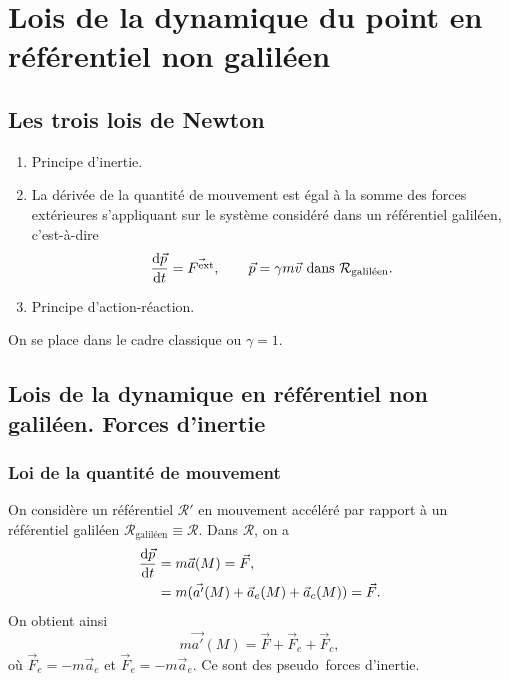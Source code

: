\section[Lois de la dynamique du point]{Lois de la dynamique du point en référentiel non galiléen}

    \subsection{Les trois lois de Newton}

        \begin{enumerate}[label=\arabic*.]
            \item Principe d'inertie.
            \item La dérivée de la quantité de mouvement est égal à la somme des forces extérieures s'appliquant sur le système considéré dans un référentiel galiléen, c'est-à-dire
            \begin{equation}
                \frac{\mathrm{d}\vec{p}}{\mathrm{d} t}=\vec{F^{\text{ext}}},\qquad \vec{p}=\gamma m\vec{v}\text{ dans }\mathcal{R}_{\text{galiléen}}.
            \end{equation}
            \item Principe d'action-réaction.
        \end{enumerate}
        On se place dans le cadre classique ou $\gamma=1$.
    
    \subsection{Lois de la dynamique en référentiel non galiléen. Forces d'inertie}
        \subsubsection{Loi de la quantité de mouvement}

            On considère un référentiel $\mathcal{R}'$ en mouvement accéléré par rapport à un référentiel galiléen $\mathcal{R}_{\text{galiléen}}\equiv\mathcal{R}$. Dans $\mathcal{R}$, on a 
            \begin{align}
                \frac{\mathrm{d}\vec{p}}{\mathrm{d} t}
                &=
                m\vec{a}(M)=\vec{F},\\
                &=m(\vec{a'}(M)+\vec{a}_e(M)+\vec{a}_c(M))=\vec{F}.
            \end{align}
            On obtient ainsi
            \begin{equation}
                m\vec{a'}(M)=\vec{F}+\vec{F}_e+\vec{F}_c,
            \end{equation}
            où $\vec{F}_e=-m\vec{a}_e$ et $\vec{F}_e=-m\vec{a}_e$. Ce sont des \og pseudo\fg~forces d'inertie.

